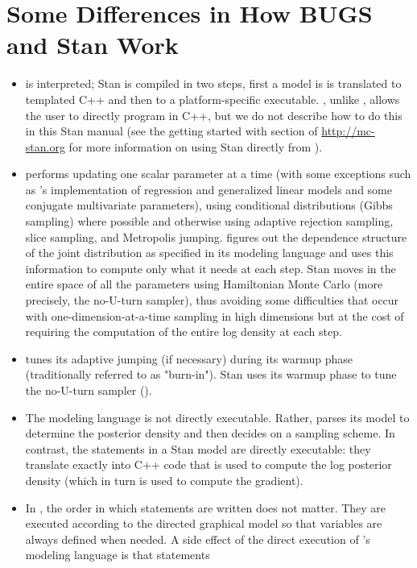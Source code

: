 \section{Some Differences in How BUGS and Stan Work}

\begin{itemize}
\item \BUGS is interpreted; Stan is compiled in two steps, first a
  model is is translated to templated C++ and then to a
  platform-specific executable.  \Stan, unlike \BUGS, allows the user
  to directly program in C++, but we do not describe how to do this in
  this Stan manual (see the getting started with \Cpp section of
  \url{http://mc-stan.org} for more information on using Stan directly
  from \Cpp). 
\item \BUGS performs \MCMC updating one scalar parameter at a time
  (with some exceptions such as \JAGS's implementation of regression
  and generalized linear models and some conjugate multivariate
  parameters), using conditional distributions (Gibbs sampling) where
  possible and otherwise using adaptive rejection sampling, slice
  sampling, and Metropolis jumping.  \BUGS figures out the dependence
  structure of the joint distribution as specified in its modeling
  language and uses this information to compute only what it needs at
  each step.  Stan moves in the entire space of all the parameters
  using Hamiltonian Monte Carlo (more precisely, the no-U-turn
  sampler), thus avoiding some difficulties that occur with
  one-dimension-at-a-time sampling in high dimensions but at the cost
  of requiring the computation of the entire log density at each step.
\item \BUGS tunes its adaptive jumping (if necessary) during its
  warmup phase (traditionally referred to as "burn-in").  Stan uses
  its warmup phase to tune the no-U-turn sampler (\NUTS).
\item The \BUGS modeling language is not directly executable.  Rather,
  \BUGS parses its model to determine the posterior density and then
  decides on a sampling scheme.  In contrast, the statements in a Stan
  model are directly executable: they translate exactly into C++ code
  that is used to compute the log posterior density (which in turn is
  used to compute the gradient).
\item In \BUGS, the order in which statements are written does not
  matter.  They are executed according to the directed graphical model
  so that variables are always defined when needed.  A side effect of
  the direct execution of \Stan's modeling language is that statements

\end{itemize}
